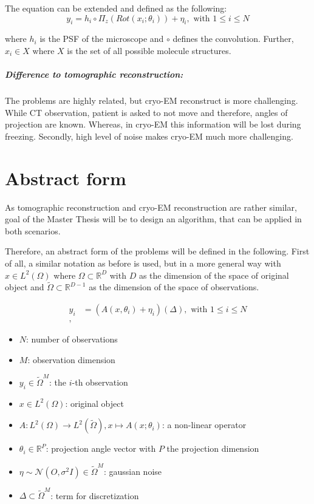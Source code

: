 The equation can be extended and defined as the following:
\begin{equation}
    \label{eq:cryoEmExtended}
    y_i = h_i \circ \Pi_z ( Rot (x_i; \theta_i)) + \eta_i, \text{ with } 1 \leq i \leq N
\end{equation}

where $h_i$ is the PSF of the microscope and $\circ$ defines the convolution.
Further, $x_i \in X$ where $X$ is the set of all possible molecule structures.


\subparagraph{Difference to tomographic reconstruction:}
The problems are highly related, but cryo-EM reconstruct is more challenging.
While CT observation, patient is asked to not move and therefore, angles of projection are known.
Whereas, in cryo-EM this information will be lost during freezing.
Secondly, high level of noise makes cryo-EM much more challenging.


\section{Abstract form}
As tomographic reconstruction and cryo-EM reconstruction are rather similar, 
goal of the Master Thesis will be to design an algorithm, that can be applied in both scenarios.

Therefore, an abstract form of the problems will be defined in the following.
First of all, a similar notation as before is used, but in a more general way with
$x \in L^2(\Omega)$ where $\Omega \subset \mathbb{R}^D$ with $D$ as the dimension of the space of original object
and $\tilde{\Omega} \subset \mathbb{R}^{D-1}$ as the dimension of the space of observations.


\begin{equation}
    \begin{aligned}
        y_i &= \left( A(x, \theta_i) + \eta_i \right) (\Delta), \text{ with } 1 \leq i \leq N\\,
    \end{aligned}
\end{equation}

\begin{itemize}
    \item $N$: number of observations
    \item $M$: observation dimension
    \item $y_i \in \tilde{\Omega}^M$: the $i$-th observation
    \item $x \in L^2(\Omega)$: original object
    \item $A: L^2(\Omega) \to L^2(\tilde{\Omega}), x \mapsto A(x; \theta_i)$: a non-linear operator 
    \item $\theta_i \in \mathbb{R}^P$: projection angle vector with $P$ the projection dimension
    \item $\eta \sim \mathcal{N}(O, \sigma^2 I) \in \tilde{\Omega}^M$: gaussian noise
    \item $\Delta \subset \tilde{\Omega}^{M}$: term for discretization
\end{itemize}

